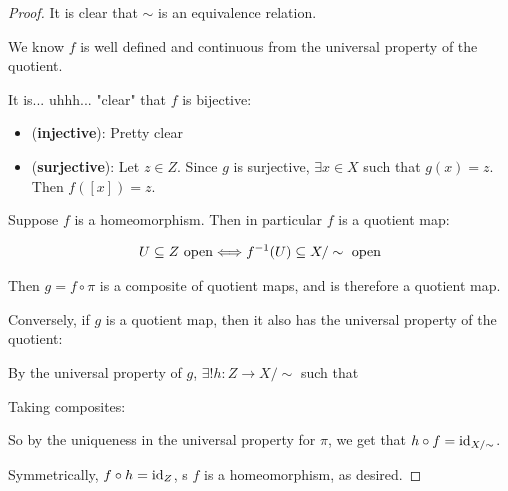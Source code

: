 \documentclass[12pt, twosided]{article}
\begin{document}
\begin{proof}
  It is clear that \(\sim\) is an equivalence relation.

  We know \(f\) is well defined and continuous from the universal property of the quotient.

  It is... uhhh... "clear" that \(f\) is bijective:
  \begin{itemize}
  \item (\textbf{injective}): Pretty clear
  \item (\textbf{surjective}): Let \(z \in Z\). Since \(g\) is surjective, \(\exists x \in X\) such that \(g(x) = z\). Then \(f([x]) = z\).
  \end{itemize}

  Suppose \(f\) is a homeomorphism. Then in particular \(f\) is a quotient map:

  \begin{align*}
    U \subseteq Z \text{ open} \Longleftrightarrow f^{-1}(U) \subseteq X/\sim\text{ open}
  \end{align*}

  Then \(g = f \circ \pi\) is a composite of quotient maps, and is therefore a quotient map.

  Conversely, if \(g\) is a quotient map, then it also has the universal property of the quotient:

  By the universal property of \(g\), \(\exists ! h: Z \to X/\sim\) such that

  \begin{center}
  \end{center}

  Taking composites:

    \begin{center}
  \end{center}
  So by the uniqueness in the universal property for \(\pi\), we get that \(h \circ f = \mathrm{id}_{X/\sim}\).

  Symmetrically, \(f \circ h = \mathrm{id}_Z\), s \(f\) is a homeomorphism, as desired.
\end{proof}
\end{document}
